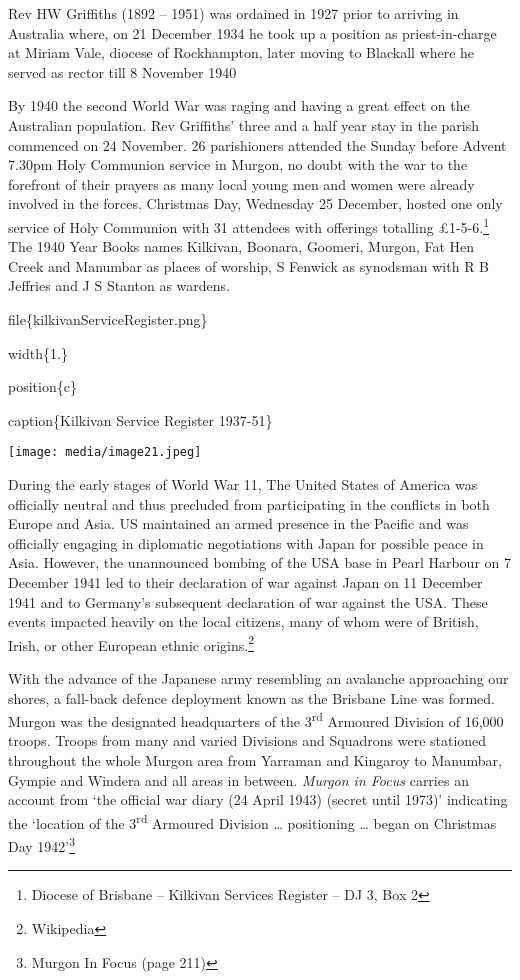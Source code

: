 Rev HW Griffiths (1892 -- 1951) was ordained in 1927 prior to arriving in Australia where, on 21 December 1934 he took up a position as priest-in-charge at Miriam Vale, diocese of Rockhampton, later moving to Blackall where he served as rector till 8 November 1940

By 1940 the second World War was raging and having a great effect on the Australian population. Rev Griffiths' three and a half year stay in the parish commenced on 24 November. 26 parishioners attended the Sunday before Advent 7.30pm Holy Communion service in Murgon, no doubt with the war to the forefront of their prayers as many local young men and women were already involved in the forces. Christmas Day, Wednesday 25 December, hosted one only service of Holy Communion with 31 attendees with offerings totalling £1-5-6.\footnote{Diocese of Brisbane -- Kilkivan Services Register -- DJ 3, Box 2} The 1940 Year Books names Kilkivan, Boonara, Goomeri, Murgon, Fat Hen Creek and Manumbar as places of worship, S Fenwick as synodsman with R B Jeffries and J S Stanton as wardens.

file\{kilkivanServiceRegister.png\}

width\{1.\}

position\{c\}

caption\{Kilkivan Service Register 1937-51\}

\texttt{[image: media/image21.jpeg]}

During the early stages of World War 11, The United States of America was officially neutral and thus precluded from participating in the conflicts in both Europe and Asia. US maintained an armed presence in the Pacific and was officially engaging in diplomatic negotiations with Japan for possible peace in Asia. However, the unannounced bombing of the USA base in Pearl Harbour on 7 December 1941 led to their declaration of war against Japan on 11 December 1941 and to Germany's subsequent declaration of war against the USA. These events impacted heavily on the local citizens, many of whom were of British, Irish, or other European ethnic origins.\footnote{Wikipedia}

With the advance of the Japanese army resembling an avalanche approaching our shores, a fall-back defence deployment known as the Brisbane Line was formed. Murgon was the designated headquarters of the 3\textsuperscript{rd} Armoured Division of 16,000 troops. Troops from many and varied Divisions and Squadrons were stationed throughout the whole Murgon area from Yarraman and Kingaroy to Manumbar, Gympie and Windera and all areas in between. \emph{Murgon in Focus} carries an account from `the official war diary (24 April 1943) (secret until 1973)' indicating the `location of the 3\textsuperscript{rd} Armoured Division \ldots{} positioning \ldots{} began on Christmas Day 1942'\footnote{Murgon In Focus (page 211)}

